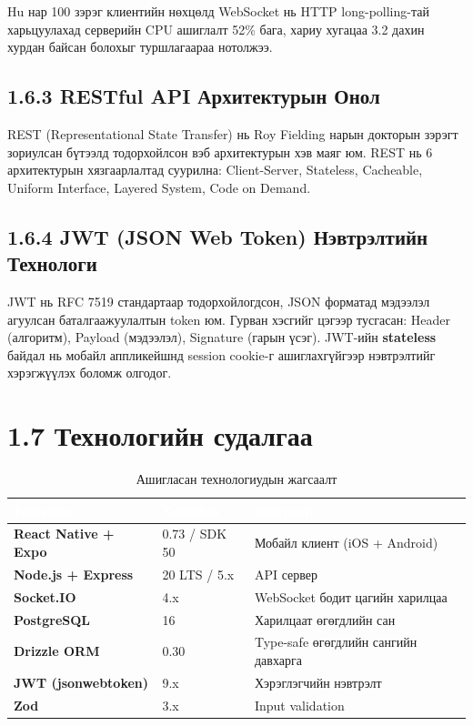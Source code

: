Hu нар \cite{hu2023} 100 зэрэг клиентийн нөхцөлд WebSocket нь HTTP long-polling-тай
харьцуулахад серверийн CPU ашиглалт 52\% бага, хариу хугацаа 3.2 дахин хурдан
байсан болохыг туршлагаараа нотолжээ.

\subsection{1.6.3 RESTful API Архитектурын Онол}

REST (Representational State Transfer) нь Roy Fielding \cite{fielding2000} нарын
докторын зэрэгт зориулсан бүтээлд тодорхойлсон вэб архитектурын хэв маяг юм.
REST нь 6 архитектурын хязгаарлалтад суурилна: Client-Server, Stateless, Cacheable,
Uniform Interface, Layered System, Code on Demand.

\subsection{1.6.4 JWT (JSON Web Token) Нэвтрэлтийн Технологи}

JWT нь RFC 7519 \cite{rfc7519} стандартаар тодорхойлогдсон, JSON форматад мэдээлэл
агуулсан баталгаажуулалтын token юм. Гурван хэсгийг цэгээр тусгасан: Header (алгоритм),
Payload (мэдээлэл), Signature (гарын үсэг). JWT-ийн \textbf{stateless} байдал нь
мобайл аппликейшнд session cookie-г ашиглахгүйгээр нэвтрэлтийг хэрэгжүүлэх
боломж олгодог.

\section{1.7 Технологийн судалгаа}

\begin{table}[htbp]
\caption{Ашигласан технологиудын жагсаалт}
\label{tab:techstack}
\centering
\begin{tabularx}{\textwidth}{|>{\bfseries}X|X|X|}
\hline
\rowcolor{TableHeader}\textcolor{white}{\textbf{Технологи}}
  & \textcolor{white}{\textbf{Хувилбар}}
  & \textcolor{white}{\textbf{Зориулалт}} \\ \hline
React Native + Expo & 0.73 / SDK 50 & Мобайл клиент (iOS + Android) \\ \hline
Node.js + Express   & 20 LTS / 5.x  & API сервер \\ \hline
Socket.IO           & 4.x           & WebSocket бодит цагийн харилцаа \\ \hline
PostgreSQL          & 16            & Харилцаат өгөгдлийн сан \\ \hline
Drizzle ORM         & 0.30          & Type-safe өгөгдлийн сангийн давхарга \\ \hline
JWT (jsonwebtoken)  & 9.x           & Хэрэглэгчийн нэвтрэлт \\ \hline
Zod                 & 3.x           & Input validation \\ \hline
\end{tabularx}
\end{table}

